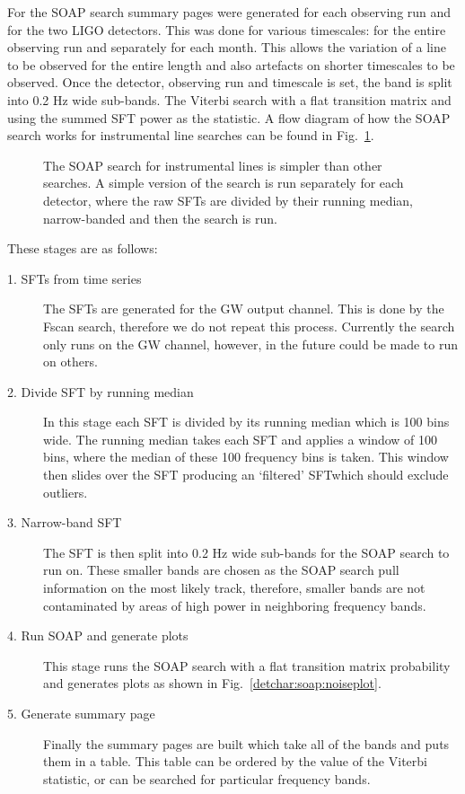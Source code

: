 For the SOAP search summary pages were generated for each observing run and for the two \gls{LIGO} detectors. 
This was done for various timescales: for the entire observing run and separately for each month.
This allows the variation of a line to be observed for the entire length and also artefacts on shorter timescales to be observed.
Once the detector, observing run and timescale is set, the band is split into 0.2 Hz wide sub-bands. 
The Viterbi search with a flat transition matrix and using the summed \gls{SFT} power as the statistic.
A flow diagram of how the SOAP search works for instrumental line searches can be found in Fig.~\ref{detchar:summary:flow}.
%
%
\begin{figure}[hp]
	\centering
	
	
	\caption[Flow diagram for SOAP line search.]{\label{detchar:summary:flow} The SOAP search for instrumental lines is simpler than other searches. A simple version of the search is run separately for each detector, where the raw \glspl{SFT} are divided by their running median, narrow-banded and then the search is run. }
	
\end{figure} 
These stages are as follows:
\begin{description}
	\item[1. \glspl{SFT} from time series] The \glspl{SFT} are generated for the \gls{GW} output channel. This is done by the Fscan search, therefore we do not repeat this process. Currently the search only runs on the \gls{GW} channel, however, in the future could be made to run on others.
	
	\item[2. Divide \gls{SFT} by running median] In this stage each \gls{SFT} is divided by its running median which is 100 bins wide. The running median takes each \gls{SFT} and applies a window of 100 bins, where the median of these 100 frequency bins is taken. This window then slides over the \gls{SFT} producing an `filtered' \gls{SFT}which should exclude outliers.
	
	\item[3. Narrow-band \gls{SFT}] The \gls{SFT} is then split into 0.2 Hz wide sub-bands for the SOAP search to run on. These smaller bands are chosen as the SOAP search pull information on the most likely track, therefore, smaller bands are not contaminated by areas of high power in neighboring frequency bands. 
	
	\item[4. Run SOAP and generate plots] This stage runs the SOAP search with a flat transition matrix probability and generates plots as shown in Fig.~\ref{detchar:soap:noiseplot}.
	
	\item[5. Generate summary page] Finally the summary pages are built which take all of the bands and puts them in a table. This table can be ordered by the value of the Viterbi statistic, or can be searched for particular frequency bands. 
\end{description}

